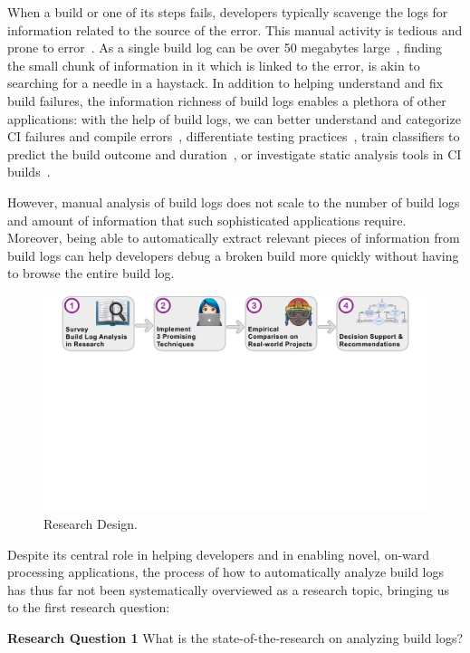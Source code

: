 When a build or one of its steps fails, developers typically
scavenge the logs for information related to the source of the error.
This manual activity is
tedious and prone to error~\cite{santolucito2018statically}.
As a
single build log can be over 50 megabytes large~\cite{beller2017oops},
finding the small chunk of information in it which is linked to the error,
is akin to searching for a
needle in a haystack.
In addition to helping understand and fix build failures, the information
richness of build logs enables a plethora of other applications: with
the help of
build logs, we can better understand and categorize CI
failures and compile
errors~\cite{islam2017insights,seo2014programmers}, differentiate
testing practices~\cite{orellana2017differences,vassallo2017a-tale},
train classifiers to predict the build outcome and
duration~\cite{ni2017cost,bisong2017built,machalica2019predictive}, or
investigate static analysis tools in CI
builds~\cite{zampetti2017open}.

However, manual analysis of build logs does not
scale to the number of build logs and amount of information that such
sophisticated applications require.
Moreover, being able to
automatically extract relevant pieces of information from build logs
can help
developers debug a broken build more quickly without having to browse
the entire build log.

\begin{figure}[htb]
	\centering
	\includegraphics[width=\textwidth, trim={1.2cm 10.5cm 1.2cm 0cm},
	clip]{img/overview.pdf}
	\caption{Research Design.}
	\label{fig:overview}
\end{figure}

Despite its central role in helping developers and in enabling
novel, on-ward processing applications,
the process of how to
automatically analyze build logs has thus far not been systematically
overviewed as a research topic, bringing us to the first
research question:
\begin{simplebox}[minipage boxed title*=-5cm]{\textbf{Research Question
1}}
What is the state-of-the-research on analyzing build logs?
\end{simplebox}

